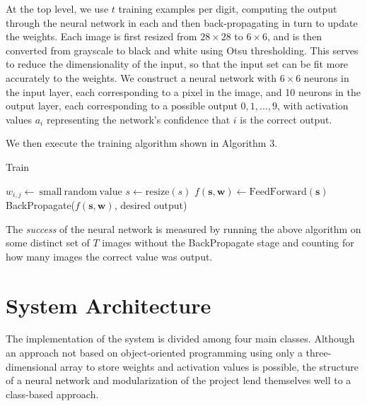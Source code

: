 \documentclass[11pt]{article}
\begin{document}
At the top level, we use $t$ training examples per digit, computing the output through the neural network in each and then back-propagating in turn to update the weights. Each image is first resized from $28\times 28$ to $6\times 6$, and is then converted from grayscale to black and white using Otsu thresholding. This serves to reduce the dimensionality of the input, so that the input set can be fit more accurately to the weights. We construct a neural network with $6\times 6$ neurons in the input layer, each corresponding to a pixel in the image, and 10 neurons in the output layer, each corresponding to a possible output $0,1,\dots,9$, with activation values $a_i$ representing the network's confidence that $i$ is the correct output.

We then execute the training algorithm shown in Algorithm 3.

\begin{algorithm}
\caption{Train}
\begin{algorithmic}[1]
  \State $w_{i,j} \gets \mathrm{\ small\ random\ value}$
\EndFor
{}
  \State $s\gets \mathrm{resize}(s)$
  \State $f(\mathbf{s},\mathbf{w})\gets \mathrm{FeedForward}(\mathbf{s})$
  \State BackPropagate($f(\mathbf{s},\mathbf{w})$, desired output)
\EndFor
\EndFunction
\end{algorithmic}
\end{algorithm}

The \emph{success} of the neural network is measured by running the above algorithm on some distinct set of $T$ images without the BackPropagate stage and counting for how many images the correct value was output.

\section{System Architecture}

The implementation of the system is divided among four main classes. Although an approach not based on object-oriented programming using only a three-dimensional array to store weights and activation values is possible, the structure of a neural network and modularization of the project lend themselves well to a class-based approach.
\end{document}
